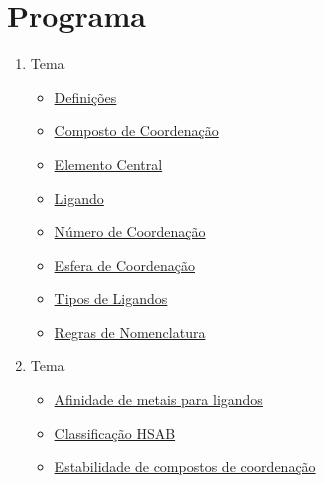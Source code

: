 \documentclass{article}
\begin{document}
\section*{Programa}
{

\begin{multicols}{2}
\begin{enumerate}
[label=\arabic*\textsuperscript{o}, leftmargin=1em]

	\item Tema
	\begin{itemize}[leftmargin=0mm]
		
		\item \hyperref[quimica de coordenacao]
			 		{Definições}
		
		\item \hyperref[composto de coordenacao]
			 		{Composto de Coordenação}
		
		\item \hyperref[elemento central]
			 		{Elemento Central}
			 
		\item \hyperref[ligando]{Ligando}
		
		\item \hyperref[numero de coordenacao]
					{Número de Coordenação}
					
		\item \hyperref[esfera de coordenacao]
					{Esfera de Coordenação}
					
		\item \hyperref[ligando]
					{Tipos de Ligandos}
					
		\item \hyperref[nomenclatura]
					{Regras de Nomenclatura}
		
	\end{itemize}
	
	
	\item Tema
	\begin{itemize}[leftmargin=0mm]
	
		\item \hyperref[hsab]
					{Afinidade de metais para ligandos}
					
		\item \hyperref[hsab]
					{Classificação HSAB}
					
		\item \hyperref[estabilidade]
			 {Estabilidade de compostos de coordenação}
			 

\end{itemize}
\end{enumerate}
\end{multicols}}
\end{document}
